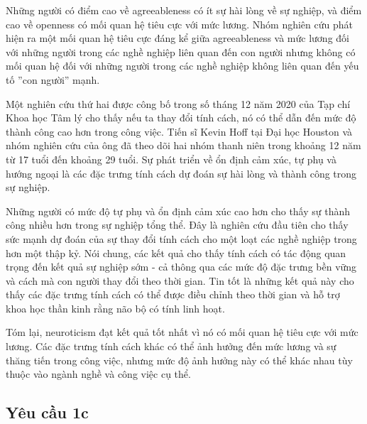 \documentclass[]{article}
\begin{document}
Những người có điểm cao về agreeableness có ít sự hài lòng về sự nghiệp, và điểm cao về openness có mối quan hệ tiêu cực với mức lương. Nhóm nghiên cứu phát hiện ra một mối quan hệ tiêu cực đáng kể giữa agreeableness và mức lương đối với những người trong các nghề nghiệp liên quan đến con người nhưng không có mối quan hệ đối với những người trong các nghề nghiệp không liên quan đến yếu tố ''con người'' mạnh.

Một nghiên cứu thứ hai được công bố trong số tháng 12 năm 2020 của Tạp chí Khoa học Tâm lý cho thấy nếu ta thay đổi tính cách, nó có thể dẫn đến mức độ thành công cao hơn trong công việc. Tiến sĩ Kevin Hoff tại Đại học Houston và nhóm nghiên cứu của ông đã theo dõi hai nhóm thanh niên trong khoảng 12 năm từ 17 tuổi đến khoảng 29 tuổi. Sự phát triển về ổn định cảm xúc, tự phụ và hướng ngoại là các đặc trưng tính cách dự đoán sự hài lòng và thành công trong sự nghiệp.

Những người có mức độ tự phụ và ổn định cảm xúc cao hơn cho thấy sự thành công nhiều hơn trong sự nghiệp tổng thể. Đây là nghiên cứu đầu tiên cho thấy sức mạnh dự đoán của sự thay đổi tính cách cho một loạt các nghề nghiệp trong hơn một thập kỷ. Nói chung, các kết quả cho thấy tính cách có tác động quan trọng đến kết quả sự nghiệp sớm - cả thông qua các mức độ đặc trưng bền vững và cách mà con người thay đổi theo thời gian. Tin tốt là những kết quả này cho thấy các đặc trưng tính cách có thể được điều chỉnh theo thời gian và hỗ trợ khoa học thần kinh rằng não bộ có tính linh hoạt. \cite{forbesScientistsDiscoverSalary}

Tóm lại, neuroticism đạt kết quả tốt nhất vì nó có mối quan hệ tiêu cực với mức lương. Các đặc trưng tính cách khác có thể ảnh hưởng đến mức lương và sự thăng tiến trong công việc, nhưng mức độ ảnh hưởng này có thể khác nhau tùy thuộc vào ngành nghề và công việc cụ thể.

\subsection{Yêu cầu 1c}
\end{document}
